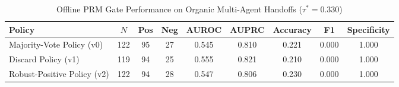 \begin{table}[htbp]
\centering
\caption{Offline PRM Gate Performance on Organic Multi-Agent Handoffs ($\tau^* = 0.330$)}
\label{tab:organic_gate_performance}
\begin{tabular}{lcccccccc}
\toprule
Policy & $N$ & Pos & Neg & AUROC & AUPRC & Accuracy & F1 & Specificity \\
\midrule
Majority-Vote Policy (v0) & 122 & 95 & 27 & 0.545 & 0.810 & 0.221 & 0.000 & 1.000 \\
Discard Policy (v1) & 119 & 94 & 25 & 0.555 & 0.821 & 0.210 & 0.000 & 1.000 \\
Robust-Positive Policy (v2) & 122 & 94 & 28 & 0.547 & 0.806 & 0.230 & 0.000 & 1.000 \\
\bottomrule
\end{tabular}
\end{table}
